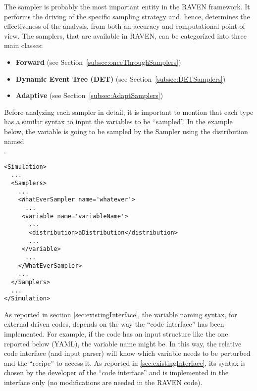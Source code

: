 \newcommand{\restartDescription}[1]
{
    \begin{itemize}
      \item \xmlNode{Restart}, \xmlDesc{string, optional field}, the
        body of this XML node must contain the name of an appropriate \textbf{PointSet} defined in the
        \xmlNode{DataObjects} block (see Section~\ref{subsec:models_ROM}).  It is used as a
        ``restart'' tool, where it accepts pre-existing solutions in the PointSet instead
        of recalculating solutions.
    \end{itemize}
}

The sampler is probably the most important entity in the RAVEN framework.
%
It performs the driving of the specific sampling strategy and, hence, determines
the effectiveness of the analysis, from both an accuracy and computational point
of view.
%
The samplers, that are available in RAVEN, can be categorized into three main
classes:
\begin{itemize}
\item \textbf{Forward} (see Section~\ref{subsec:onceThroughSamplers})
\item \textbf{Dynamic Event Tree (DET)} (see Section~\ref{subsec:DETSamplers})
\item \textbf{Adaptive} (see Section~\ref{subsec:AdaptSamplers})
\end{itemize}
Before analyzing each sampler in detail, it is important to mention that each
type has a similar syntax to input the variables to be ``sampled''.
%
In the example below, the variable  is going to be
sampled by the Sampler  using the distribution named\\
.
\begin{lstlisting}[style=XML]
<Simulation>
  ...
  <Samplers>
    ...
    <WhatEverSampler name='whatever'>
      ...
     <variable name='variableName'>
       ...
       <distribution>aDistribution</distribution>
       ...
     </variable>
      ...
    </WhatEverSampler>
    ...
  </Samplers>
  ...
</Simulation>
\end{lstlisting}

As reported in section \ref{sec:existingInterface}, the variable naming syntax,
for external driven codes, depends on the way the ``code interface'' has been
implemented.
%
For example, if the code has an input structure like the one reported below (YAML), the
variable name might be.
%
In this way, the relative code interface (and input parser) will know which
variable needs to be perturbed and the ``recipe'' to access it.
%
As reported in \ref{sec:existingInterface}, its syntax is chosen by the
developer of the ``code interface'' and is implemented in the interface only
(no modifications are needed in the RAVEN code).


